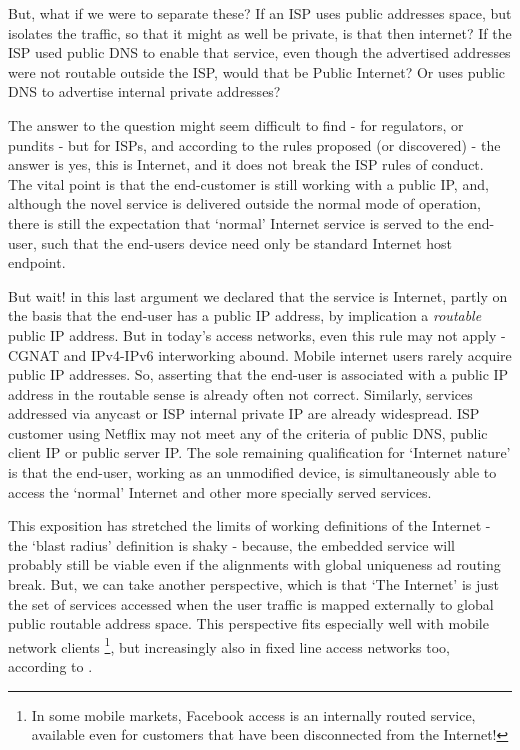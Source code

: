  But, what if we were to separate these?  If an ISP uses public addresses space, but isolates the traffic, so that it might as well be private, is that then internet?  If the ISP used public DNS to enable that service, even though the advertised addresses were not routable outside the ISP, would that be Public Internet?  Or uses public DNS to advertise internal private addresses?

 The answer to the question might seem difficult to find - for regulators, or pundits - but for ISPs, and according to the rules proposed (or discovered) - the answer is yes, this is Internet, and it does not break the ISP rules of conduct.  The vital point is that the end-customer is still working with a public IP, and, although the novel service is delivered outside the normal mode of operation, there is still the expectation that `normal' Internet service is served to the end-user, such that the end-users device need only be standard Internet host endpoint.

 But wait!  in this last argument we declared that the service is Internet, partly on the basis that the end-user has a public IP address, by implication a \textit{routable} public IP address.  But in today's access networks, even this rule may not apply - CGNAT and IPv4-IPv6 interworking abound.
 Mobile internet users rarely acquire public IP addresses.  So, asserting that the end-user is associated with a public IP address in the routable sense is already often not correct.  Similarly, services addressed via anycast or ISP internal private IP are already widespread.  ISP customer using Netflix may not meet any of the criteria of public DNS, public client IP or public server IP.  The sole remaining qualification for `Internet nature' is that the end-user, working as an unmodified device, is simultaneously able to access the `normal' Internet and other more specially served services.

 This exposition has stretched the limits of working definitions of the Internet - the `blast radius' definition is shaky - because, the embedded service will probably still be viable even if the alignments with global uniqueness ad routing break.  But, we can take another perspective, which is that `The Internet' is just the set of services accessed when the user traffic is mapped externally to global public routable address space.   This perspective fits especially well with mobile network clients \footnote{In some mobile markets, Facebook access is an internally routed service, available even for customers that have been disconnected from the Internet! }, but increasingly also in fixed line access networks too, according to .

